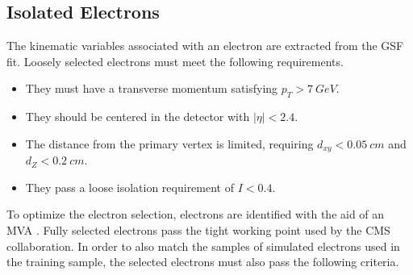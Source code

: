 \subsection{Isolated Electrons} \label{sec:ele-def}

The kinematic variables associated with an electron are extracted from the GSF fit.
Loosely selected electrons must meet the following requirements.
\begin{itemize}
\item They must have a transverse momentum satisfying $p_T > \SI{7}{GeV}$.
\item They should be centered in the detector with $|\eta| < 2.4$.
\item The distance from the primary vertex is limited, requiring
  $d_{xy} < \SI{0.05}{cm}$ and $d_Z < \SI{0.2}{cm}$.
\item They pass a loose isolation requirement of $I < 0.4$.
\end{itemize}
To optimize the electron selection,
electrons are identified with the aid of an MVA \cite{Rembser_2019}.
Fully selected electrons pass the tight working point used by the CMS collaboration.
In order to also match the samples of simulated electrons used in the training sample,
the selected electrons must also pass the following criteria.
